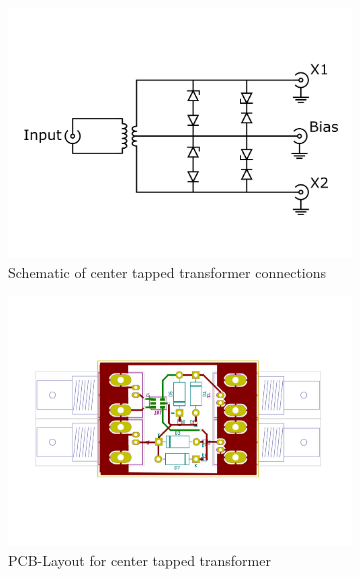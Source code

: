 \begin{figure}[ht]
	\centering
	\begin{subfigure}{0.4\textwidth}
		\centering
		\includegraphics[width=\textwidth]{Chapters/Deflection/circuit_CTT4zu3}
		\caption{Schematic of center tapped transformer connections}
		\label{fig:circuit_ctt}
	\end{subfigure}
	\hspace{0.1\textwidth}
	\begin{subfigure}{0.4\textwidth}
		\centering
		\includegraphics[width=\textwidth]{Chapters/Deflection/PCB_CTT3}
		\caption{PCB-Layout for center tapped transformer}
		\label{fig:PCB_CTT}
	\end{subfigure}
	\caption{}
	\label{fig:CTT}
\end{figure}



